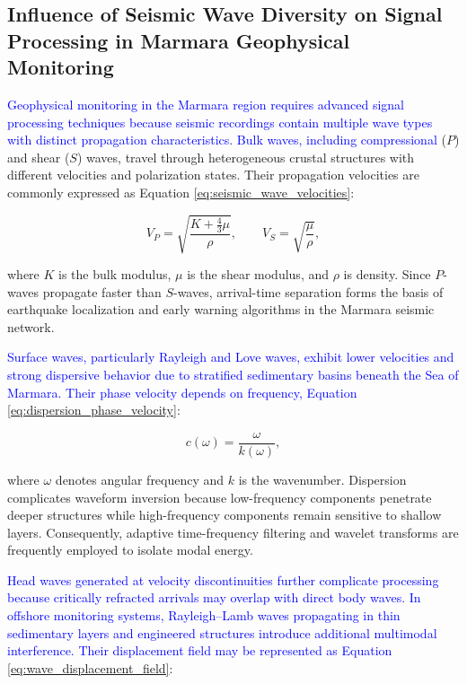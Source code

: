 \documentclass[data,article,submit,pdftex,moreauthors]{Definitions/mdpi}
\begin{document}
\subsection{Influence of Seismic Wave Diversity on Signal Processing in Marmara Geophysical Monitoring}

\textcolor{blue}{Geophysical monitoring in the Marmara region requires advanced signal processing techniques because seismic recordings contain multiple wave types with distinct propagation characteristics. Bulk waves, including compressional} ($P$) and shear ($S$) waves, travel through heterogeneous crustal structures with different velocities and polarization states. Their propagation velocities are commonly expressed as Equation \ref{eq:seismic_wave_velocities}:

\begin{equation}
\label{eq:seismic_wave_velocities}
V_P = \sqrt{\frac{K + \frac{4}{3}\mu}{\rho}},
\qquad
V_S = \sqrt{\frac{\mu}{\rho}},
\end{equation}

where $K$ is the bulk modulus, $\mu$ is the shear modulus, and $\rho$ is density. Since $P$-waves propagate faster than $S$-waves, arrival-time separation forms the basis of earthquake localization and early warning algorithms in the Marmara seismic network.

\textcolor{blue}{Surface waves, particularly Rayleigh and Love waves, exhibit lower velocities and strong dispersive behavior due to stratified sedimentary basins beneath the Sea of Marmara. Their phase velocity depends on frequency, Equation} \ref{eq:dispersion_phase_velocity}:

\begin{equation}
\label{eq:dispersion_phase_velocity}
c(\omega) = \frac{\omega}{k(\omega)},
\end{equation}

where $\omega$ denotes angular frequency and $k$ is the wavenumber. Dispersion complicates waveform inversion because low-frequency components penetrate deeper structures while high-frequency components remain sensitive to shallow layers. Consequently, adaptive time-frequency filtering and wavelet transforms are frequently employed to isolate modal energy.

\textcolor{blue}{Head waves generated at velocity discontinuities further complicate processing because critically refracted arrivals may overlap with direct body waves. In offshore monitoring systems, Rayleigh--Lamb waves propagating in thin sedimentary layers and engineered structures introduce additional multimodal interference. Their displacement field may be represented as Equation }\ref{eq:wave_displacement_field}:
\end{document}
